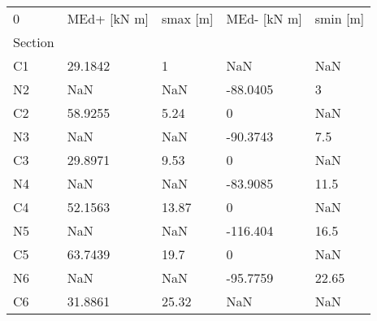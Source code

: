 \begin{tabular}{lllll}
\toprule
0 & MEd+ [kN m] & smax [m] & MEd- [kN m] & smin [m] \\
Section &             &          &             &          \\
\midrule
C1      &     29.1842 &        1 &         NaN &      NaN \\
N2      &         NaN &      NaN &    -88.0405 &        3 \\
C2      &     58.9255 &     5.24 &           0 &      NaN \\
N3      &         NaN &      NaN &    -90.3743 &      7.5 \\
C3      &     29.8971 &     9.53 &           0 &      NaN \\
N4      &         NaN &      NaN &    -83.9085 &     11.5 \\
C4      &     52.1563 &    13.87 &           0 &      NaN \\
N5      &         NaN &      NaN &    -116.404 &     16.5 \\
C5      &     63.7439 &     19.7 &           0 &      NaN \\
N6      &         NaN &      NaN &    -95.7759 &    22.65 \\
C6      &     31.8861 &    25.32 &         NaN &      NaN \\
\bottomrule
\end{tabular}
